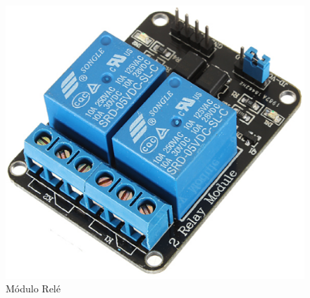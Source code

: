\begin{figure}[!htb]                   
	\centering                          
	\includegraphics[scale=0.3]{figuras/Figura_10.eps}
	\caption{Módulo Relé}               
\end{figure}	
